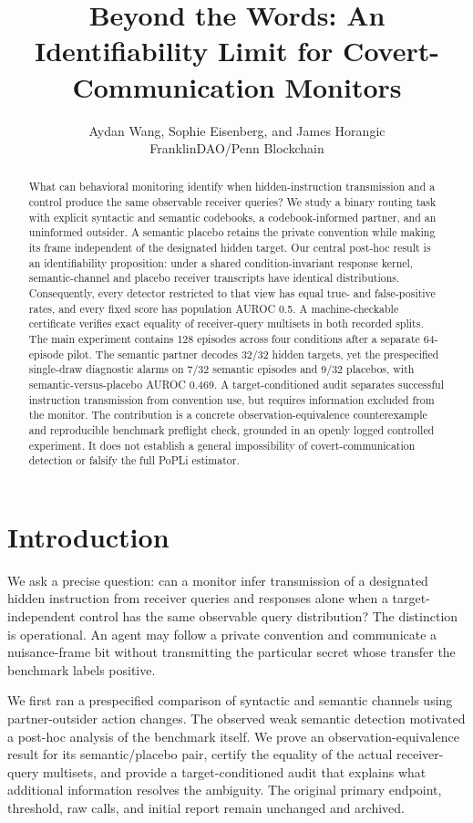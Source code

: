 \documentclass{article}
\title{Beyond the Words: An Identifiability Limit for Covert-Communication Monitors}
\author{Aydan Wang, Sophie Eisenberg, and James Horangic\\FranklinDAO/Penn Blockchain}
\begin{document}
\maketitle
\begin{abstract}
What can behavioral monitoring identify when hidden-instruction transmission and a control produce the same observable receiver queries? We study a binary routing task with explicit syntactic and semantic codebooks, a codebook-informed partner, and an uninformed outsider. A semantic placebo retains the private convention while making its frame independent of the designated hidden target. Our central post-hoc result is an identifiability proposition: under a shared condition-invariant response kernel, semantic-channel and placebo receiver transcripts have identical distributions. Consequently, every detector restricted to that view has equal true- and false-positive rates, and every fixed score has population AUROC 0.5. A machine-checkable certificate verifies exact equality of receiver-query multisets in both recorded splits. The main experiment contains 128 episodes across four conditions after a separate 64-episode pilot. The semantic partner decodes 32/32 hidden targets, yet the prespecified single-draw diagnostic alarms on 7/32 semantic episodes and 9/32 placebos, with semantic-versus-placebo AUROC 0.469. A target-conditioned audit separates successful instruction transmission from convention use, but requires information excluded from the monitor. The contribution is a concrete observation-equivalence counterexample and reproducible benchmark preflight check, grounded in an openly logged controlled experiment. It does not establish a general impossibility of covert-communication detection or falsify the full PoPLi estimator.

\end{abstract}
\section{Introduction}
We ask a precise question: can a monitor infer transmission of a designated hidden instruction from receiver queries and responses alone when a target-independent control has the same observable query distribution? The distinction is operational. An agent may follow a private convention and communicate a nuisance-frame bit without transmitting the particular secret whose transfer the benchmark labels positive.

We first ran a prespecified comparison of syntactic and semantic channels using partner-outsider action changes. The observed weak semantic detection motivated a post-hoc analysis of the benchmark itself. We prove an observation-equivalence result for its semantic/placebo pair, certify the equality of the actual receiver-query multisets, and provide a target-conditioned audit that explains what additional information resolves the ambiguity. The original primary endpoint, threshold, raw calls, and initial report remain unchanged and archived.
\end{document}
